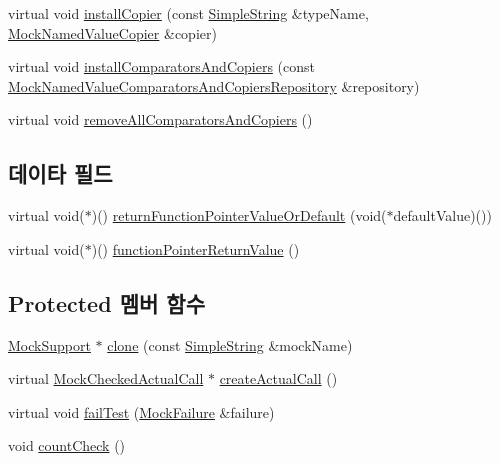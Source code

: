 \begin{DoxyCompactItemize}
\item 
virtual void \hyperlink{class_mock_support_a989b3e03deb9ce609bed0dbec3128105}{install\+Copier} (const \hyperlink{class_simple_string}{Simple\+String} \&type\+Name, \hyperlink{class_mock_named_value_copier}{Mock\+Named\+Value\+Copier} \&copier)
\item 
virtual void \hyperlink{class_mock_support_a827874c390edb4be766153fe9e7ce6ab}{install\+Comparators\+And\+Copiers} (const \hyperlink{class_mock_named_value_comparators_and_copiers_repository}{Mock\+Named\+Value\+Comparators\+And\+Copiers\+Repository} \&repository)
\item 
virtual void \hyperlink{class_mock_support_ab08e47e42e0a20c2c7ac300ec1f9c8f2}{remove\+All\+Comparators\+And\+Copiers} ()
\end{DoxyCompactItemize}
\subsection*{데이타 필드}
\begin{DoxyCompactItemize}
\item 
virtual void($\ast$)() \hyperlink{class_mock_support_aaccaf7aaf2fab5a0a747af7db552bbfd}{return\+Function\+Pointer\+Value\+Or\+Default} (void($\ast$default\+Value)())
\item 
virtual void($\ast$)() \hyperlink{class_mock_support_adc6850dbb1a8c97f5d9974d38c7b1ba3}{function\+Pointer\+Return\+Value} ()
\end{DoxyCompactItemize}
\subsection*{Protected 멤버 함수}
\begin{DoxyCompactItemize}
\item 
\hyperlink{class_mock_support}{Mock\+Support} $\ast$ \hyperlink{class_mock_support_a3ba369d95973ddb4bcd6cfffd32a3c2e}{clone} (const \hyperlink{class_simple_string}{Simple\+String} \&mock\+Name)
\item 
virtual \hyperlink{class_mock_checked_actual_call}{Mock\+Checked\+Actual\+Call} $\ast$ \hyperlink{class_mock_support_a58f4dfd3e9682829a8815c7b9de986d0}{create\+Actual\+Call} ()
\item 
virtual void \hyperlink{class_mock_support_a569bf29b3fe0256d75f48c288e4a4085}{fail\+Test} (\hyperlink{class_mock_failure}{Mock\+Failure} \&failure)
\item 
void \hyperlink{class_mock_support_a58577489a2418efb4c440761e533f2e7}{count\+Check} ()
\end{DoxyCompactItemize}
